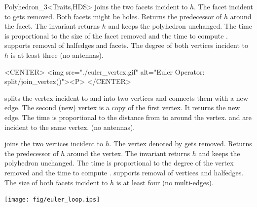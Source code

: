 \begin{ccClassTemplate}{Polyhedron_3<Traits,HDS>}
    {joins the two facets incident to $h$. The facet incident to
       gets removed. Both facets might be
    holes. Returns the predecessor of $h$ around the facet. The invariant
     returns $h$ and keeps
    the polyhedron unchanged. The time is proportional to the size of the
    facet removed and the time to compute .
    \ccPrecond {} supports removal of halfedges and facets. The
    degree of both vertices incident to $h$ is at least three (no antennas).}

\begin{ccHtmlOnly}
    <CENTER>
    <img src="./euler_vertex.gif" alt="Euler Operator: split/join_vertex()"><P>
    </CENTER>
\end{ccHtmlOnly}

    {splits the vertex incident to  and  into two vertices
      and connects them with a new edge. The second (new) vertex is a
      copy of the first vertex. It returns the new edge. The time is
      proportional to the distance from  to  around the vertex.
    \ccPrecond {} and  are incident to the same vertex.
                (no antennas).}

    {joins the two vertices incident to $h$. The vertex denoted by
       gets removed. Returns the predecessor of
    $h$ around the vertex. The invariant 
     returns
    $h$ and keeps the polyhedron unchanged. 
    The time is proportional to the degree of the vertex removed and 
    the time to compute .
    \ccPrecond {} supports removal of vertices and halfedges. The
    size of both facets incident to $h$ is at least four (no multi-edges).}

\newpage
{}

\begin{ccTexOnly}
    \begin{center}
      \parbox{0.636\textwidth}{%
          \texttt{[image: fig/euler\_loop.ips]}%
      }
    \end{center}
\end{ccTexOnly}


\end{ccClassTemplate}

